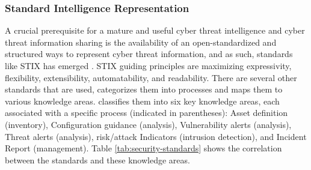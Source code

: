 \subsubsection{Standard Intelligence Representation}
A crucial prerequisite for a mature and useful cyber threat intelligence and cyber threat information sharing is the availability of an open-standardized and structured ways to represent cyber threat information, and as such, standards like STIX has emerged \cite{barnum_stix_2012}. STIX guiding principles are maximizing expressivity, flexibility, extensibility, automatability, and readability. There are several other standards that are used, \cite{hernandez-ardieta_information_2013} categorizes them into processes and maps them to various knowledge areas. \cite{hernandez-ardieta_information_2013} classifies them into six key knowledge areas, each associated with a specific process (indicated in parentheses): Asset definition (inventory), Configuration guidance (analysis), Vulnerability alerts (analysis), Threat alerts (analysis), risk/attack Indicators (intrusion detection), and Incident Report (management). Table \ref{tab:security-standards} shows the correlation between the standards and these knowledge areas.

